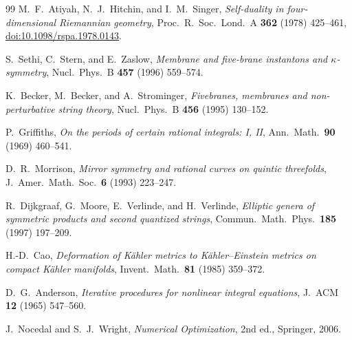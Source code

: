 \documentclass[11pt,a4paper]{article}
\begin{document}
\begin{thebibliography}{99}
M.~F.~Atiyah, N.~J.~Hitchin, and I.~M.~Singer,
\emph{Self-duality in four-dimensional Riemannian geometry},
Proc.\ R.\ Soc.\ Lond.\ A \textbf{362} (1978) 425--461,
\href{https://doi.org/10.1098/rspa.1978.0143}{doi:10.1098/rspa.1978.0143}.

S.~Sethi, C.~Stern, and E.~Zaslow,
\emph{Membrane and five-brane instantons and $\kappa$-symmetry},
Nucl.\ Phys.\ B \textbf{457} (1996) 559--574.

K.~Becker, M.~Becker, and A.~Strominger,
\emph{Fivebranes, membranes and non-perturbative string theory},
Nucl.\ Phys.\ B \textbf{456} (1995) 130--152.

P.~Griffiths,
\emph{On the periods of certain rational integrals: I, II},
Ann.\ Math.\ \textbf{90} (1969) 460--541.

D.~R.~Morrison,
\emph{Mirror symmetry and rational curves on quintic threefolds},
J.\ Amer.\ Math.\ Soc.\ \textbf{6} (1993) 223--247.

R.~Dijkgraaf, G.~Moore, E.~Verlinde, and H.~Verlinde,
\emph{Elliptic genera of symmetric products and second quantized strings},
Commun.\ Math.\ Phys.\ \textbf{185} (1997) 197--209.

H.-D.~Cao,
\emph{Deformation of K\"{a}hler metrics to K\"{a}hler--Einstein metrics on compact K\"{a}hler manifolds},
Invent.\ Math.\ \textbf{81} (1985) 359--372.

D.~G.~Anderson,
\emph{Iterative procedures for nonlinear integral equations},
J.\ ACM \textbf{12} (1965) 547--560.

J.~Nocedal and S.~J.~Wright,
\emph{Numerical Optimization}, 2nd ed., Springer, 2006.

\end{thebibliography}
\end{document}
